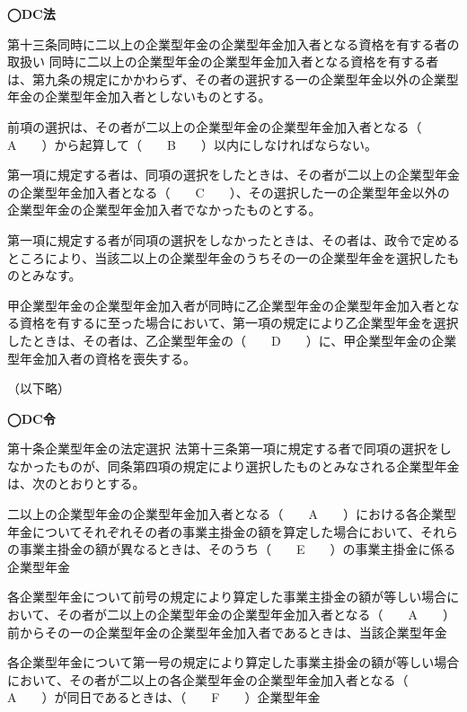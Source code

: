 \begin{fillblank}[数理人試験 2020 問題2 設問1]
  \noindent \textbf{◯DC法}
  \begin{lawstructure}
    \begin{lawarticle}{第十三条}{同時に二以上の企業型年金の企業型年金加入者となる資格を有する者の取扱い}
      同時に二以上の企業型年金の企業型年金加入者となる資格を有する者は、第九条の規定にかかわらず、その者の選択する一の企業型年金以外の企業型年金の企業型年金加入者としないものとする。

      前項の選択は、その者が二以上の企業型年金の企業型年金加入者となる（　　A　　）から起算して（　　B　　）以内にしなければならない。

      第一項に規定する者は、同項の選択をしたときは、その者が二以上の企業型年金の企業型年金加入者となる（　　C　　）、その選択した一の企業型年金以外の企業型年金の企業型年金加入者でなかったものとする。

      第一項に規定する者が同項の選択をしなかったときは、その者は、政令で定めるところにより、当該二以上の企業型年金のうちその一の企業型年金を選択したものとみなす。

      甲企業型年金の企業型年金加入者が同時に乙企業型年金の企業型年金加入者となる資格を有するに至った場合において、第一項の規定により乙企業型年金を選択したときは、その者は、乙企業型年金の（　　D　　）に、甲企業型年金の企業型年金加入者の資格を喪失する。
      
      （以下略）
    \end{lawarticle}
  \end{lawstructure}

  \noindent \textbf{◯DC令}
  \begin{lawstructure}
    \begin{lawarticle}{第十条}{企業型年金の法定選択}
      法第十三条第一項に規定する者で同項の選択をしなかったものが、同条第四項の規定により選択したものとみなされる企業型年金は、次のとおりとする。

      二以上の企業型年金の企業型年金加入者となる（　　A　　）における各企業型年金についてそれぞれその者の事業主掛金の額を算定した場合において、それらの事業主掛金の額が異なるときは、そのうち（　　E　　）の事業主掛金に係る企業型年金

      各企業型年金について前号の規定により算定した事業主掛金の額が等しい場合において、その者が二以上の企業型年金の企業型年金加入者となる（　　A　　）前からその一の企業型年金の企業型年金加入者であるときは、当該企業型年金

      各企業型年金について第一号の規定により算定した事業主掛金の額が等しい場合において、その者が二以上の各企業型年金の企業型年金加入者となる（　　A　　）が同日であるときは、（　　F　　）企業型年金
    \end{lawarticle}
  \end{lawstructure}    
\end{fillblank}

